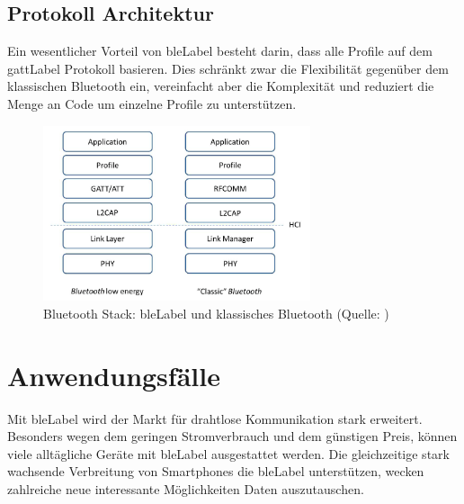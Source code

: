 \subsection{Protokoll Architektur}
Ein wesentlicher Vorteil von \gls{bleLabel} besteht darin, dass alle Profile auf dem \gls{gattLabel} Protokoll basieren.
Dies schränkt zwar die Flexibilität gegenüber dem klassischen Bluetooth ein, vereinfacht aber die Komplexität und reduziert die Menge an Code um einzelne Profile zu unterstützen.
\begin{figure}[H]
	\centering
	\includegraphics[width=0.7\textwidth]{images/ble/bluetooth_stack.png}
	\caption[Bluetooth Stack: \gls{bleLabel} und klassisches Bluetooth]{Bluetooth Stack: \gls{bleLabel} und klassisches Bluetooth (Quelle: \cite[][4]{ti_whitepaper_2015-05-08})}
\end{figure}


\section{Anwendungsfälle}
Mit \gls{bleLabel} wird der Markt für drahtlose Kommunikation stark erweitert.
Besonders wegen dem geringen Stromverbrauch und dem günstigen Preis, können viele alltägliche Geräte mit \gls{bleLabel} ausgestattet werden.
Die gleichzeitige stark wachsende Verbreitung von Smartphones die \gls{bleLabel} unterstützen, wecken zahlreiche neue interessante Möglichkeiten Daten auszutauschen.

